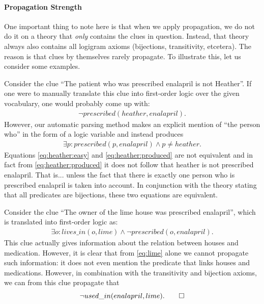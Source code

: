 


\paragraph{Propagation Strength}
One important thing to note here is that when we apply propagation, we do not do it on a theory that \emph{only} contains the clues in question. Instead, that theory always also contains all logigram axioms (bijections, transitivity, etcetera). 
The reason is that clues by themselves rarely propagate. To illustrate this, let us consider some examples. 
\begin{example}
 Consider the clue ``The patient who was prescribed enalapril is not Heather''. If one were to manually translate this clue into first-order logic over the given vocabulary, one would probably come up with: 
 \begin{align}\lnot \mathit{prescribed}(heather,enalapril).\label{eq:heather:easy}\end{align}
 However, our automatic parsing method makes an explicit mention of ``the person who'' in the form of a logic variable and instead produces 
 \begin{align}
  \exists p: prescribed(p,enalapril) \land p \neq heather.\label{eq:heather:produced}
\end{align}
Equations \eqref{eq:heather:easy} and \eqref{eq:heather:produced} are not equivalent and in fact from \eqref{eq:heather:produced} it does not follow that heather is not prescribed enalapril. That is... unless the fact that there is exactly one person who is prescribed enalapril is taken into account. In conjunction with the theory stating that all predicates are bijections, these two equations are equivalent. 
% 
% 
\end{example}

\begin{example}
 Consider the clue ``The owner of the lime house was prescribed enalapril'', which is translated into first-order logic as:
 \begin{align}
\exists o: lives\_in(o,lime) \land \lnot prescribed(o,enalapril).   \label{eq:lime}
 \end{align}
 This clue actually gives information about the relation between houses and medication. However, it is clear that from \eqref{eq:lime} alone we cannot propagate such information: it does not even mention the predicate that links houses and medications. 
 However, in combination with the transitivity and bijection axioms, we can from this clue propagate that 
 \[\lnot used\_in(enalapril,lime).\qedhere\]
\end{example}

